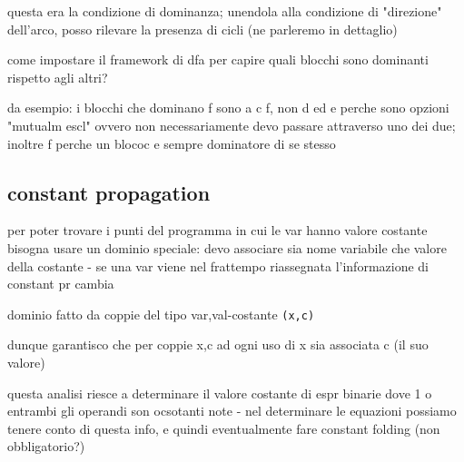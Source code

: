 questa era la condizione di dominanza; unendola alla condizione di "direzione" dell'arco, posso rilevare la presenza di cicli (ne parleremo in dettaglio)

come impostare il framework di dfa per capire quali blocchi sono dominanti rispetto agli altri?

da esempio: i blocchi che dominano f sono a c f, non d ed e perche sono opzioni "mutualm escl" ovvero non necessariamente devo passare attraverso uno dei due; inoltre f perche un blococ e sempre dominatore di se stesso

\subsection{constant propagation}

per poter trovare i punti del programma in cui le var hanno valore costante bisogna usare un dominio speciale: devo associare sia nome variabile che valore della costante - se una var viene nel frattempo riassegnata l'informazione di constant pr cambia

dominio fatto da coppie del tipo var,val-costante \lstinline|(x,c)|

dunque garantisco che per coppie x,c ad ogni uso di x sia associata c (il suo valore)

questa analisi riesce a determinare il valore costante di espr binarie dove 1 o entrambi gli operandi son ocsotanti note - nel determinare le equazioni possiamo tenere conto di questa info, e quindi eventualmente fare constant folding (non obbligatorio?)


